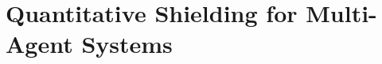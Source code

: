 
\chapter{Quantitative Shielding for Multi-Agent Systems} \label{sec:quantshielding}




%

%

%

%

%

%



%
%

